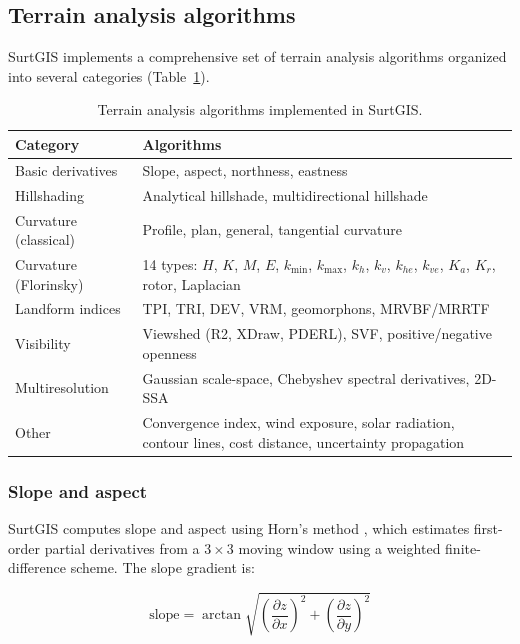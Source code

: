 \documentclass[preprint,review,12pt,authoryear]{elsarticle}
\begin{document}
\subsection{Terrain analysis algorithms}
\label{subsec:terrain}

SurtGIS implements a comprehensive set of terrain analysis algorithms organized into several categories (Table~\ref{tab:terrain}).

\begin{table}[htbp]
\centering
\caption{Terrain analysis algorithms implemented in SurtGIS.}
\label{tab:terrain}
\begin{tabular}{@{}lp{9cm}@{}}
\toprule
Category & Algorithms \\
\midrule
Basic derivatives & Slope, aspect, northness, eastness \\
Hillshading & Analytical hillshade, multidirectional hillshade \\
Curvature (classical) & Profile, plan, general, tangential curvature \\
Curvature (Florinsky) & 14 types: $H$, $K$, $M$, $E$, $k_{\min}$, $k_{\max}$, $k_h$, $k_v$, $k_{he}$, $k_{ve}$, $K_a$, $K_r$, rotor, Laplacian \\
Landform indices & TPI, TRI, DEV, VRM, geomorphons, MRVBF/MRRTF \\
Visibility & Viewshed (R2, XDraw, PDERL), SVF, positive/negative openness \\
Multiresolution & Gaussian scale-space, Chebyshev spectral derivatives, 2D-SSA \\
Other & Convergence index, wind exposure, solar radiation, contour lines, cost distance, uncertainty propagation \\
\bottomrule
\end{tabular}
\end{table}

\subsubsection{Slope and aspect}

SurtGIS computes slope and aspect using Horn's method \citep{horn1981}, which estimates first-order partial derivatives from a $3 \times 3$ moving window using a weighted finite-difference scheme. The slope gradient is:

\begin{equation}
\text{slope} = \arctan\!\sqrt{\left(\frac{\partial z}{\partial x}\right)^2 + \left(\frac{\partial z}{\partial y}\right)^2}
\label{eq:slope}
\end{equation}
\end{document}
